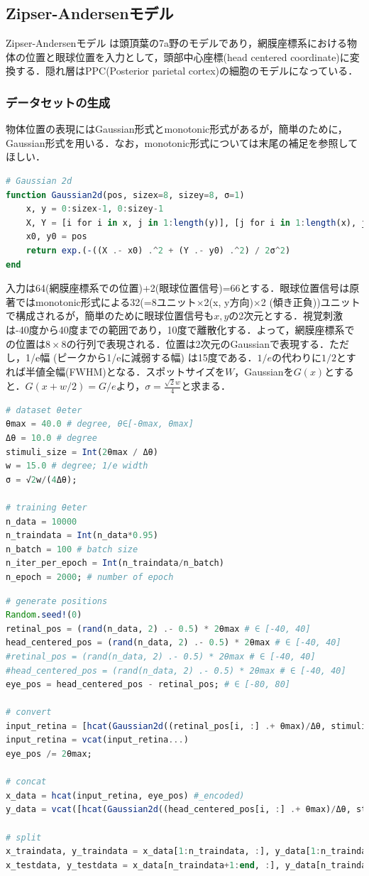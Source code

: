 \subsection{Zipser-Andersenモデル}
Zipser-Andersenモデル \citep{Zipser1988-nc} は頭頂葉の7a野のモデルであり，網膜座標系における物体の位置と眼球位置を入力として，頭部中心座標(head centered coordinate)に変換する．隠れ層はPPC(Posterior parietal cortex)の細胞のモデルになっている．
\subsubsection{データセットの生成}
物体位置の表現にはGaussian形式とmonotonic形式があるが，簡単のために，Gaussian形式を用いる．なお，monotonic形式については末尾の補足を参照してほしい．
\begin{lstlisting}[language=julia]
# Gaussian 2d
function Gaussian2d(pos, sizex=8, sizey=8, σ=1)
    x, y = 0:sizex-1, 0:sizey-1
    X, Y = [i for i in x, j in 1:length(y)], [j for i in 1:length(x), j in y]
    x0, y0 = pos
    return exp.(-((X .- x0) .^2 + (Y .- y0) .^2) / 2σ^2)
end
\end{lstlisting}
入力は64(網膜座標系での位置)+2(眼球位置信号)=66とする．眼球位置信号は原著ではmonotonic形式による32(=8ユニット×2(x, y方向)×2 (傾き正負))ユニットで構成されるが，簡単のために眼球位置信号も$x, y$の2次元とする．視覚刺激は-40度から40度までの範囲であり，10度で離散化する．よって，網膜座標系での位置は$8\times 8$の行列で表現される．位置は2次元のGaussianで表現する．ただし，1/e幅 (ピークから1/eに減弱する幅) は15度である．$1/e$の代わりに$1/2$とすれば半値全幅(FWHM)となる．スポットサイズを$W$，Gaussianを$G(x)$とすると．$G(x+w/2)=G/e$より，$\sigma=\frac{\sqrt{2}w}{4}$と求まる．
\begin{lstlisting}[language=julia]
# dataset θeter
θmax = 40.0 # degree, θ∈[-θmax, θmax]
Δθ = 10.0 # degree
stimuli_size = Int(2θmax / Δθ)
w = 15.0 # degree; 1/e width
σ = √2w/(4Δθ);

# training θeter
n_data = 10000
n_traindata = Int(n_data*0.95)
n_batch = 100 # batch size
n_iter_per_epoch = Int(n_traindata/n_batch)
n_epoch = 2000; # number of epoch
\end{lstlisting}
\begin{lstlisting}[language=julia]
# generate positions
Random.seed!(0)
retinal_pos = (rand(n_data, 2) .- 0.5) * 2θmax # ∈ [-40, 40]
head_centered_pos = (rand(n_data, 2) .- 0.5) * 2θmax # ∈ [-40, 40]
#retinal_pos = (rand(n_data, 2) .- 0.5) * 2θmax # ∈ [-40, 40]
#head_centered_pos = (rand(n_data, 2) .- 0.5) * 2θmax # ∈ [-40, 40]
eye_pos = head_centered_pos - retinal_pos; # ∈ [-80, 80]

# convert
input_retina = [hcat(Gaussian2d((retinal_pos[i, :] .+ θmax)/Δθ, stimuli_size, stimuli_size, σ)...) for i in 1:n_data];
input_retina = vcat(input_retina...)
eye_pos /= 2θmax;

# concat
x_data = hcat(input_retina, eye_pos) #_encoded)
y_data = vcat([hcat(Gaussian2d((head_centered_pos[i, :] .+ θmax)/Δθ, stimuli_size, stimuli_size, σ)...) for i in 1:n_data]...);

# split
x_traindata, y_traindata = x_data[1:n_traindata, :], y_data[1:n_traindata, :]
x_testdata, y_testdata = x_data[n_traindata+1:end, :], y_data[n_traindata+1:end, :];
\end{lstlisting}
